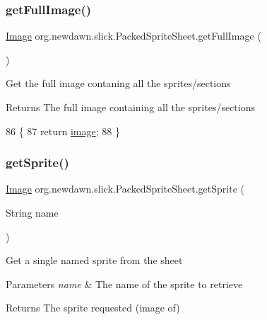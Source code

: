 \subsubsection{\texorpdfstring{get\+Full\+Image()}{getFullImage()}}
{\footnotesize\ttfamily \mbox{\hyperlink{classorg_1_1newdawn_1_1slick_1_1_image}{Image}} org.\+newdawn.\+slick.\+Packed\+Sprite\+Sheet.\+get\+Full\+Image (\begin{DoxyParamCaption}{ }\end{DoxyParamCaption})\hspace{0.3cm}{\ttfamily [inline]}}

Get the full image contaning all the sprites/sections

\begin{DoxyReturn}{Returns}
The full image containing all the sprites/sections 
\end{DoxyReturn}

\begin{DoxyCode}
86                                 \{
87         \textcolor{keywordflow}{return} \mbox{\hyperlink{classorg_1_1newdawn_1_1slick_1_1_packed_sprite_sheet_a3bfe1d01086f84a9f9bdacbfb2f5ceba}{image}};
88     \}
\end{DoxyCode}
\mbox{\label{classorg_1_1newdawn_1_1slick_1_1_packed_sprite_sheet_ac3ba876d0be75c93724ebe035787041e}} 
\subsubsection{\texorpdfstring{get\+Sprite()}{getSprite()}}
{\footnotesize\ttfamily \mbox{\hyperlink{classorg_1_1newdawn_1_1slick_1_1_image}{Image}} org.\+newdawn.\+slick.\+Packed\+Sprite\+Sheet.\+get\+Sprite (\begin{DoxyParamCaption}\item[{String}]{name }\end{DoxyParamCaption})\hspace{0.3cm}{\ttfamily [inline]}}

Get a single named sprite from the sheet


\begin{DoxyParams}{Parameters}
{\em name} & The name of the sprite to retrieve \\
\hline
\end{DoxyParams}
\begin{DoxyReturn}{Returns}
The sprite requested (image of) 
\end{DoxyReturn}


